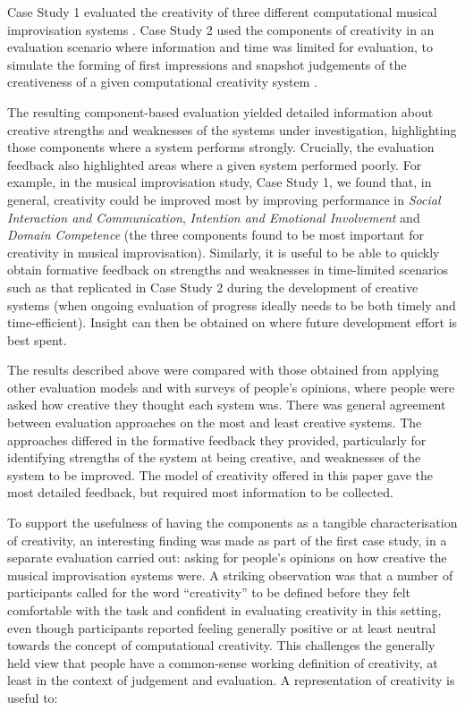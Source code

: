 \documentclass[10pt,letterpaper]{article}
\begin{document}
Case Study 1 \cite{jordanousphd,jordanous12cc} evaluated the creativity of three different computational musical improvisation systems \cite{jordanous12cc}. 
Case Study 2 used the components of creativity in an evaluation scenario where information and time was limited for evaluation, to simulate the forming of first impressions and snapshot judgements of the creativeness of a given computational creativity system \cite{jordanousphd,jordanous16aisb}. 

The resulting component-based evaluation yielded detailed information about creative strengths and weaknesses of the systems under investigation, highlighting those components where a system performs strongly. Crucially, the evaluation feedback also highlighted areas where a given system performed poorly. For example, in the musical improvisation study, Case Study 1, we found that, in general, creativity could be improved most by improving performance in {\em Social Interaction and Communication}, {\em Intention and Emotional Involvement} and {\em Domain Competence} (the three components found to be most important for creativity in musical improvisation). Similarly, it is useful to be able to quickly obtain formative feedback on strengths and weaknesses in time-limited scenarios such as that replicated in Case Study 2 during the development of creative systems (when ongoing evaluation of progress ideally needs to be both timely and time-efficient). Insight can then be obtained on where future development effort is best spent. 

The results described above were compared with those obtained from applying other evaluation models and with surveys of people's opinions, where people were asked how creative they thought each system was. There was general agreement between evaluation approaches on the most and least creative systems. The approaches differed in the formative feedback they provided, particularly for identifying strengths of the system at being creative, and weaknesses of the system to be improved. The model of creativity offered in this paper gave the most detailed feedback, but required most information to be collected. 

To support the usefulness of having the components as a tangible characterisation of creativity, an interesting finding was made as part of the first case study, in a separate evaluation carried out: asking for people's opinions on how creative the musical improvisation systems were. A striking observation was that a number of participants called for the word ``creativity'' to be defined before they felt comfortable with the task and confident in evaluating creativity in this setting, even though participants reported feeling generally positive or at least neutral towards the concept of computational creativity. This challenges the generally held view that people have a  common-sense working definition of creativity, at least in the context of judgement and evaluation. A representation of creativity is useful to:
\end{document}
